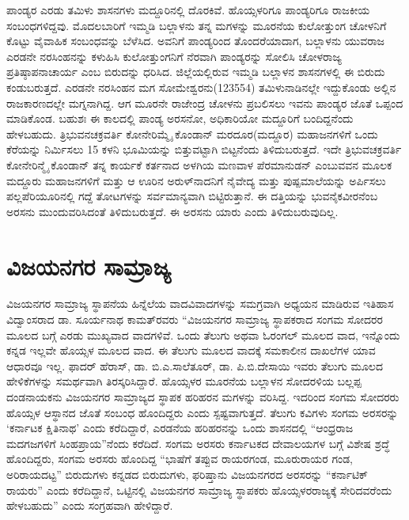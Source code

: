 ಪಾಂಡ್ಯರ ಎರಡು ತಮಿಳು ಶಾಸನಗಳು ಮದ್ದೂರಿನಲ್ಲಿ ದೊರಕಿವೆ. ಹೊಯ್ಸಳರಿಗೂ ಪಾಂಡ್ಯರಿಗೂ ರಾಜಕೀಯ ಸಂಬಂಧಗಳಿ\-ದ್ದವು. ಮೊದಲಬಾರಿಗೆ ಇಮ್ಮಡಿ ಬಲ್ಲಾಳನು ತನ್ನ ಮಗಳನ್ನು ಮೂರನೆಯ ಕುಲೋತ್ತುಂಗ ಚೋಳನಿಗೆ ಕೊಟ್ಟು ವೈವಾಹಿಕ ಸಂಬಂಧವನ್ನು ಬೆಳೆಸಿದ. ಅವನಿಗೆ ಪಾಂಡ್ಯರಿಂದ ತೊಂದರೆಯಾದಾಗ, ಬಲ್ಲಾಳನು ಯುವರಾಜ ಎರಡನೇ ನರಸಿಂಹನನ್ನು ಕಳುಹಿಸಿ ಕುಲೋತ್ತುಂಗನಿಗೆ ನೆರವಾಗಿ ಪಾಂಡ್ಯರನ್ನು ಸೋಲಿಸಿ ಚೋಳರಾಜ್ಯ ಪ್ರತಿಷ್ಠಾಪನಾಚಾರ್ಯ ಎಂಬ ಬಿರುದನ್ನು ಧರಿಸಿದ. ಜಿಲ್ಲೆಯಲ್ಲಿರುವ ಇಮ್ಮಡಿ ಬಲ್ಲಾಳನ ಶಾಸನಗಳಲ್ಲಿ ಈ ಬಿರುದು ಕಂಡುಬರುತ್ತದೆ. ಎರಡನೇ ನರಸಿಂಹನ ಮಗ ಸೋಮೇಶ್ವರನು(1235\enginline{-}54) ತಮಿಳುನಾಡಿನಲ್ಲೇ ಇದ್ದುಕೊಂಡು ಅಲ್ಲಿನ ರಾಜಕಾರಣದಲ್ಲೇ ಮಗ್ನನಾಗಿದ್ದ. ಆಗ ಮೂರನೇ ರಾಜೇಂದ್ರ ಚೋಳನು ಪ್ರಬಲಿಸಲು ಇವನು ಪಾಂಡ್ಯರ ಜೊತೆ ಒಪ್ಪಂದ ಮಾಡಿಕೊಂಡ. ಬಹುಶಃ ಈ ಕಾಲದಲ್ಲಿ ಪಾಂಡ್ಯ ಅರಸನೋ, ಅಧಿಕಾರಿಯೋ ಮದ್ದೂರಿಗೆ ಬಂದಿದ್ದನೆಂದು ಹೇಳಬಹುದು. ತ್ರಿಭುವನಚಕ್ರವರ್ತಿ ಕೋನೇರಿಮ್ಮೈ ಕೊಂಡಾನ್​ ಮರದೂರ(ಮದ್ದೂರ) ಮಹಾಜನಗಳಿಗೆ ಒಂದು ಕೆರೆಯನ್ನು ನಿರ್ಮಿಸಲು 15 ಕಳನಿ ಭೂಮಿಯನ್ನು ಬಿತ್ತುವಟ್ಟಾಗಿ ಬಿಟ್ಟನೆಂದು ತಿಳಿದುಬರುತ್ತದೆ. ಇದೇ ತ್ರಿಭುವಚಕ್ರವರ್ತಿ ಕೋನೇರಿನ್ಮೈ ಕೊಂಡಾನ್​ ತನ್ನ ಕಾರ್ಯಕೆ ಕರ್ತನಾದ ಅಳಗಿಯ ಮಣವಾಳ ಪೆರಮಾನುಡನ್​ ಎಂಬುವವನ ಮೂಲಕ ಮದ್ದೂರು ಮಹಾಜನಗಳಿಗೆ ಮತ್ತು ಆ ಊರಿನ ಅರುಳ್​ನಾದನಿಗೆ ನೈವೇದ್ಯ ಮತ್ತು ಪುಷ್ಪಮಾಲೆಯನ್ನು ಅರ್ಪಿಸಲು ಪಲ್ಲಪೆರಿಯೂರಿನಲ್ಲಿ ಗದ್ದೆ ತೋಟಗಳನ್ನು ಸರ್ವಮಾನ್ಯವಾಗಿ ಬಿಟ್ಟಿರುತ್ತಾನೆ. ಈ ದತ್ತಿಯನ್ನು ಭುವನೈಕವೀರನೆಂಬ ಅರಸನು ಮುಂದುವರಿಸಿದಂತೆ ತಿಳಿದುಬರುತ್ತದೆ. ಈ ಅರಸನು ಯಾರು ಎಂದು ತಿಳಿದುಬರುವುದಿಲ್ಲ.


\section*{ವಿಜಯನಗರ ಸಾಮ್ರಾಜ್ಯ}

\vskip -6pt

ವಿಜಯನಗರ ಸಾಮ್ರಾಜ್ಯ ಸ್ಥಾಪನೆಯ ಹಿನ್ನೆಲೆಯ ವಾದವಿವಾದಗಳನ್ನು ಸಮಗ್ರವಾಗಿ ಅಧ್ಯಯನ ಮಾಡಿರುವ ಇತಿಹಾಸ ವಿದ್ವಾಂಸರಾದ ಡಾ. ಸೂರ್ಯನಾಥ ಕಾಮತ್​ರವರು “ವಿಜಯನಗರ ಸಾಮ್ರಾಜ್ಯ ಸ್ಥಾಪಕರಾದ ಸಂಗಮ ಸೋದರರ ಮೂಲದ ಬಗ್ಗೆ ಎರಡು ಮುಖ್ಯವಾದ ವಾದಗಳಿವೆ. ಒಂದು ತೆಲುಗು ಅಥವಾ ಓರಂಗಲ್​ ಮೂಲದ ವಾದ, ಇನ್ನೊಂದು ಕನ್ನಡ ಇಲ್ಲವೇ ಹೊಯ್ಸಳ ಮೂಲದ ವಾದ. ಈ ತೆಲುಗು ಮೂಲದ ವಾದಕ್ಕೆ ಸಮಕಾಲೀನ ದಾಖಲೆಗಳ ಯಾವ ಆಧಾರವೂ ಇಲ್ಲ. ಫಾದರ್​ ಹೆರಾಸ್​, ಡಾ. ಬಿ.ಎ.ಸಾಲೆತೂರ್​, ಡಾ. ಪಿ.ಬಿ.ದೇಸಾಯಿ ಇವರು ತೆಲುಗು ಮೂಲದ ಹೇಳಿಕೆಗಳನ್ನು ಸಮರ್ಥವಾಗಿ ತಿರಸ್ಕರಿಸಿದ್ದಾರೆ. ಹೊಯ್ಸಳರ ಮೂರನೆಯ ಬಲ್ಲಾಳನ ಸೋದರಳಿಯ ಬಲ್ಲಪ್ಪ ದಂಡನಾಯಕನು ವಿಜಯನಗರ ಸಾಮ್ರಾಜ್ಯದ ಸ್ಥಾಪಕ ಹರಿಹರನ ಮಗಳನ್ನು ವರಿಸಿದ್ದ. ಇದರಿಂದ ಸಂಗಮ ಸೋದರರು ಹೊಯ್ಸಳ ಆಸ್ಥಾನದ ಜೊತೆ ಸಂಬಂಧ ಹೊಂದಿದ್ದರು ಎಂದು ಸ್ಪಷ್ಟವಾಗುತ್ತದೆ. ತೆಲುಗು ಕವಿಗಳು ಸಂಗಮ ಅರಸರನ್ನು ‘ಕರ್ನಾಟಕ ಕ್ಷಿತಿನಾಥ’ ಎಂದು ಕರೆದಿದ್ದಾರೆ, ಎರಡನೆಯ ಹರಿಹರನನ್ನು ಒಂದು ಶಾಸನದಲ್ಲಿ “ಆಂಧ್ರರಾಜ ಮದಗಜಗಳಿಗೆ ಸಿಂಹಪ್ರಾಯ”ನೆಂದು ಕರೆದಿದೆ. ಸಂಗಮ ಅರಸರು ಕರ್ನಾಟಕದ ದೇವಾಲಯಗಳ ಬಗ್ಗೆ ವಿಶೇಷ ಶ್ರದ್ಧೆ ಹೊಂದಿದ್ದರು, ಸಂಗಮ ಅರಸರು ಹೊಂದಿದ್ದ “ಭಾಷೆಗೆ ತಪ್ಪುವ ರಾಯರಗಂಡ, ಮೂರುರಾಯರ ಗಂಡ, ಅರಿರಾಯದಟ್ಟ” ಬಿರುದುಗಳು ಕನ್ನಡದ ಬಿರುದುಗಳು, ಫರಿಷ್ತಾನು ವಿಜಯನಗರದ ಅರಸರನ್ನು “ಕರ್ನಾಟಿಕ್​ ರಾಯರು” ಎಂದು ಕರೆದಿದ್ದಾನೆ, ಒಟ್ಟಿನಲ್ಲಿ ವಿಜಯನಗರ ಸಾಮ್ರಾಜ್ಯ ಸ್ಥಾಪಕರು ಹೊಯ್ಸಳರರಾಜ್ಯಕ್ಕೆ ಸೇರಿದವರೆಂದು ಹೇಳಬಹುದು” ಎಂದು ಸಂಗ್ರಹವಾಗಿ ಹೇಳಿದ್ದಾರೆ.

